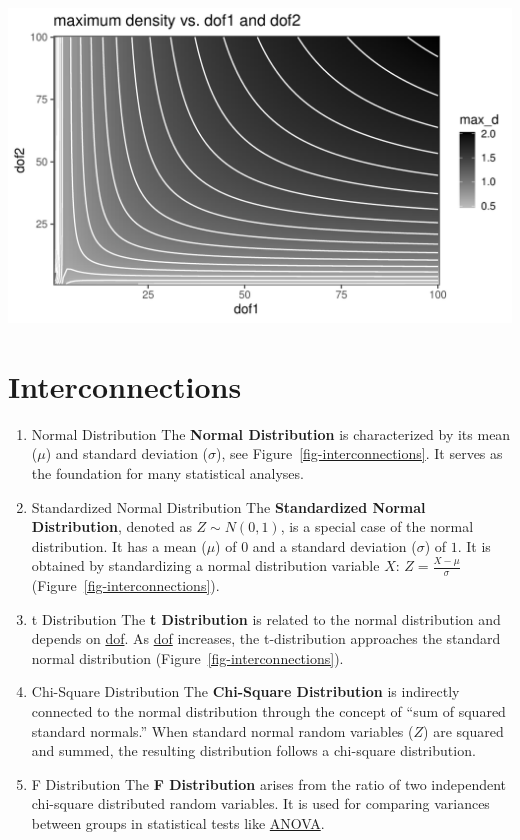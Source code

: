 \documentclass[
  a4paper,
]{scrbook}
\begin{document}
\includegraphics[width=1\linewidth,height=\textheight,keepaspectratio]{chapter001_Distributions_files/figure-pdf/unnamed-chunk-10-1.pdf}

\section{Interconnections}\label{interconnections}

\begin{enumerate}
\def\labelenumi{\arabic{enumi}.}
\item
  Normal Distribution The \textbf{Normal Distribution} is characterized
  by its mean (\(\mu\)) and standard deviation (\(\sigma\)), see
  Figure~\ref{fig-interconnections}. It serves as the foundation for
  many statistical analyses.
\item
  Standardized Normal Distribution The \textbf{Standardized Normal
  Distribution}, denoted as \(Z \sim N(0, 1)\), is a special case of the
  normal distribution. It has a mean (\(\mu\)) of \(0\) and a standard
  deviation (\(\sigma\)) of \(1\). It is obtained by standardizing a
  normal distribution variable \(X\): \(Z = \frac{X - \mu}{\sigma}\)
  (Figure~\ref{fig-interconnections}).
\item
  t Distribution The \textbf{t Distribution} is related to the normal
  distribution and depends on \hyperref[acronyms_dof]{dof}. As
  \hyperref[acronyms_dof]{dof} increases, the t-distribution approaches
  the standard normal distribution (Figure~\ref{fig-interconnections}).
\item
  Chi-Square Distribution The \textbf{Chi-Square Distribution} is
  indirectly connected to the normal distribution through the concept of
  ``sum of squared standard normals.'' When standard normal random
  variables (\(Z\)) are squared and summed, the resulting distribution
  follows a chi-square distribution.
\item
  F Distribution The \textbf{F Distribution} arises from the ratio of
  two independent chi-square distributed random variables. It is used
  for comparing variances between groups in statistical tests like
  \hyperref[acronyms_ANOVA]{ANOVA}.
\end{enumerate}
\end{document}
